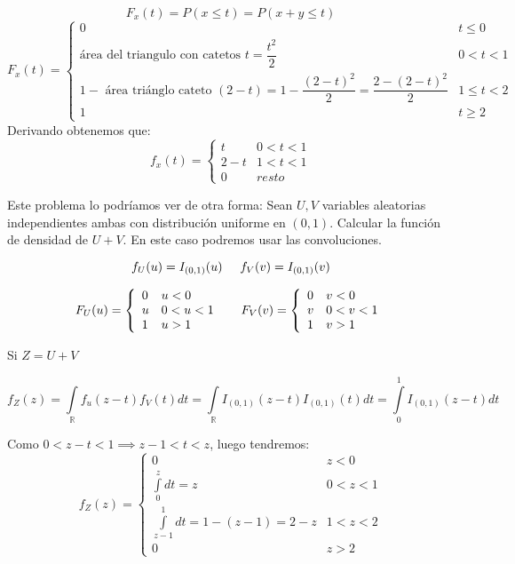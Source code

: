 \documentclass[openany]{book}
\begin{document}
\begin{exercise}
    $$ F_{x}(t) = P(x\leq t) = P(x+y\leq t) $$
    $$ F_{x}(t) = \left\{
    \begin{array}{ll}
        0 & t\leq 0\\
         \text{área del triangulo con catetos } t = \dfrac{t^2}{2} & 0 < t < 1\\
         1-\text{ área triánglo cateto } (2-t) = 1-\dfrac{(2-t)^2}{2} = \dfrac{2-(2-t)^2}{2} & 1\leq t < 2\\
         1 & t \geq 2
    \end{array}
    \right. $$
    Derivando obtenemos que:
    $$ f_{x}(t) = \left\{
    \begin{array}{ll}
        t & 0 < t < 1\\
        2-t & 1 < t < 1 \\
        0 & resto
    \end{array}
    \right. $$

    Este problema lo podríamos ver de otra forma: Sean $ U,V $ variables aleatorias independientes ambas con distribución uniforme en $ (0,1) $. Calcular la función de densidad de $ U+V $. En este caso podremos usar las convoluciones.

    $$ f_{U}(u) = I_{(0,1)}(u) \hspace{5mm} f_{V}(v) = I_{(0,1)}(v) $$

    $$ F_{U}(u) = \left\{
        \begin{array}{ll}
            0 & u < 0\\
            u & 0<u<1\\
            1 & u>1
        \end{array}
        \right. \hspace{5mm} F_{V}(v) = \left\{
    \begin{array}{ll}
        0 & v < 0\\
        v & 0<v<1\\
        1 & v>1
    \end{array}
    \right. $$

    Si $ Z = U+V $

$$ f_{Z}(z) = \int\limits_{\mathbb{R}}^{}f_{u}(z-t)f_{V}(t)dt = \int\limits_{\mathbb{R}}^{}I_{(0,1)}(z-t)I_{(0,1)}(t)dt  = \int\limits_{0}^{1}I_{(0,1)}(z-t)dt $$

Como $ 0<z-t<1 \implies z-1<t<z $, luego tendremos:
$$ f_{Z}(z) = \left\{
\begin{array}{ll}
    0 & z< 0 \\
    \int\limits_{0}^{z}dt = z & 0<z<1 \\
    \int\limits_{z-1}^{1}dt = 1-(z-1) = 2-z & 1<z<2\\
    0 & z>2 
\end{array}
\right. $$


\end{exercise}
\end{document}
